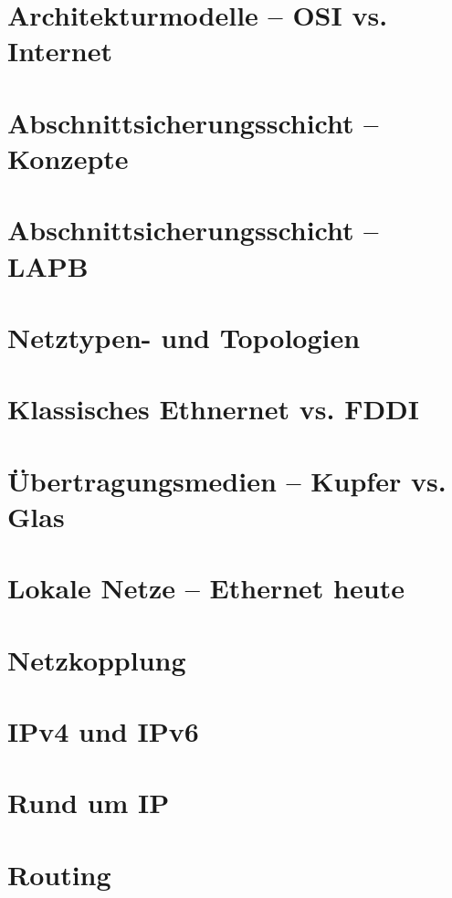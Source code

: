 \documentclass[hidelinks]{article}
\begin{document}
\section{Architekturmodelle -- OSI vs. Internet}

\section{Abschnittsicherungsschicht -- Konzepte}

\section{Abschnittsicherungsschicht -- LAPB}

\section{Netztypen- und Topologien}

\section{Klassisches Ethnernet vs. FDDI}

\section{Übertragungsmedien -- Kupfer vs. Glas}

\section{Lokale Netze -- Ethernet heute}

\section{Netzkopplung}

\section{IPv4 und IPv6}

\section{Rund um IP}

\section{Routing}
\end{document}
